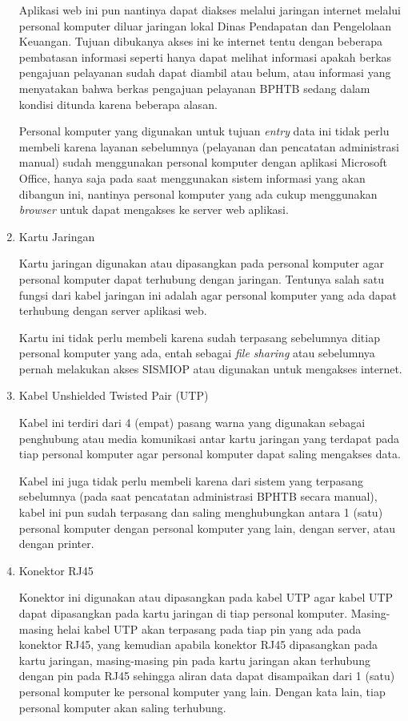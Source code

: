\documentclass[pdftex,12pt, oneside]{article}
\begin{document}
\begin{enumerate}[1.]
Aplikasi web ini pun nantinya dapat diakses melalui jaringan internet melalui personal komputer diluar jaringan lokal Dinas Pendapatan dan Pengelolaan Keuangan. Tujuan dibukanya akses ini ke internet tentu dengan beberapa pembatasan informasi seperti hanya dapat melihat informasi apakah berkas pengajuan pelayanan sudah dapat diambil atau belum, atau informasi yang menyatakan bahwa berkas pengajuan pelayanan BPHTB sedang dalam kondisi ditunda karena beberapa alasan.

Personal komputer yang digunakan untuk tujuan \textit{entry} data ini tidak perlu membeli karena layanan sebelumnya (pelayanan dan pencatatan administrasi manual) sudah menggunakan personal komputer dengan aplikasi Microsoft Office, hanya saja pada saat menggunakan sistem informasi yang akan dibangun ini, nantinya personal komputer yang ada cukup menggunakan \textit{browser} untuk dapat mengakses ke server web aplikasi.

  \item Kartu Jaringan
  
Kartu jaringan digunakan atau dipasangkan pada personal komputer agar personal komputer dapat terhubung dengan jaringan. Tentunya salah satu fungsi dari kabel jaringan ini adalah agar personal komputer yang ada dapat terhubung dengan server aplikasi web.

Kartu ini tidak perlu membeli karena sudah terpasang sebelumnya ditiap personal komputer yang ada, entah sebagai \textit{file sharing} atau sebelumnya pernah melakukan akses SISMIOP atau digunakan untuk mengakses internet.

  \item Kabel Unshielded Twisted Pair (UTP)
  
Kabel ini terdiri dari 4 (empat) pasang warna yang digunakan sebagai penghubung atau media komunikasi antar kartu jaringan yang terdapat pada tiap personal komputer agar personal komputer dapat saling mengakses data.

Kabel ini juga tidak perlu membeli karena dari sistem yang terpasang sebelumnya (pada saat pencatatan administrasi BPHTB secara manual), kabel ini pun sudah terpasang dan saling menghubungkan antara 1 (satu) personal komputer dengan personal komputer yang lain, dengan server, atau dengan printer.

  \item Konektor RJ45
  
Konektor ini digunakan atau dipasangkan pada kabel UTP agar kabel UTP dapat dipasangkan pada kartu jaringan di tiap personal komputer. Masing-masing helai kabel UTP akan terpasang pada tiap pin yang ada pada konektor RJ45, yang kemudian apabila konektor RJ45 dipasangkan pada kartu jaringan, masing-masing pin pada kartu jaringan akan terhubung dengan pin pada RJ45 sehingga aliran data dapat disampaikan dari 1 (satu) personal komputer ke personal komputer yang lain. Dengan kata lain, tiap personal komputer akan saling terhubung.


\end{enumerate}
\end{document}
